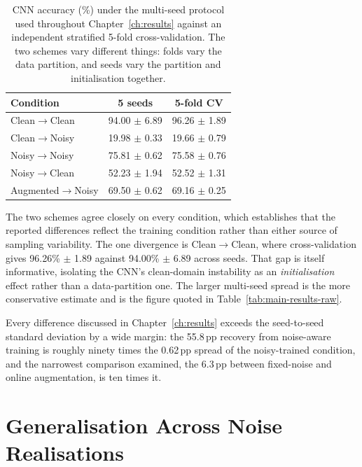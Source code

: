 \begin{table}[htbp]
\centering
\caption[Multi-seed protocol against 5-fold cross-validation]{CNN accuracy (\%) under the multi-seed protocol used throughout Chapter~\ref{ch:results} against an independent stratified 5-fold cross-validation. The two schemes vary different things: folds vary the data partition, and seeds vary the partition and initialisation together.}
\label{tab:app-crossval}
\small
\setlength{\tabcolsep}{8pt}
\begin{tabular}{@{}lcc@{}}
\toprule
\textbf{Condition} & \textbf{5 seeds} & \textbf{5-fold CV} \\
\midrule
Clean$\to$Clean       & 94.00 $\pm$ 6.89 & 96.26 $\pm$ 1.89 \\
Clean$\to$Noisy       & 19.98 $\pm$ 0.33 & 19.66 $\pm$ 0.79 \\
Noisy$\to$Noisy       & 75.81 $\pm$ 0.62 & 75.58 $\pm$ 0.76 \\
Noisy$\to$Clean       & 52.23 $\pm$ 1.94 & 52.52 $\pm$ 1.31 \\
Augmented$\to$Noisy   & 69.50 $\pm$ 0.62 & 69.16 $\pm$ 0.25 \\
\bottomrule
\end{tabular}
\end{table}

The two schemes agree closely on every condition, which establishes that the reported differences reflect the training condition rather than either source of sampling variability. The one divergence is Clean$\to$Clean, where cross-validation gives 96.26\% $\pm$ 1.89 against 94.00\% $\pm$ 6.89 across seeds. That gap is itself informative, isolating the CNN's clean-domain instability as an \emph{initialisation} effect rather than a data-partition one. The larger multi-seed spread is the more conservative estimate and is the figure quoted in Table~\ref{tab:main-results-raw}.

Every difference discussed in Chapter~\ref{ch:results} exceeds the seed-to-seed standard deviation by a wide margin: the 55.8\,pp recovery from noise-aware training is roughly ninety times the 0.62\,pp spread of the noisy-trained condition, and the narrowest comparison examined, the 6.3\,pp between fixed-noise and online augmentation, is ten times it.

\section{Generalisation Across Noise Realisations}
\label{app:memorisation}


